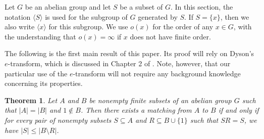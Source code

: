 \documentclass[11pt]{amsart}
\newtheorem{theorem}{Theorem}[section]
\theoremstyle{definition}
\theoremstyle{remark}
\begin{document}
Let \( G \) be an abelian group and let \( S \) be a subset of \( G \).  In this section, the notation \( \langle S \rangle \) is used for the subgroup of \( G \) generated by \( S \). If \( S = \{ x \} \), then we also write \( \langle x \rangle \) for this subgroup. We use \( o(x) \) for the order of any \( x \in G \), with the understanding that \( o(x) = \infty \) if \( x \) does not have finite order.  

The following is the first main result of this paper.  Its proof will rely on Dyson's \( e \)-transform, which is discussed in Chapter 2 of \cite{Nathanson}.
Note, however, that our particular use of the \( e \)-transform will not require any background knowledge concerning its properties.

\begin{theorem}  \label{CharForAbelianGroups}
Let \( A \) and \( B \) be nonempty finite subsets of an abelian group \( G \) such that \( |A| = |B| \) and \( 1 \notin B \).  Then there exists a matching from \( A \) to \( B \) if and only if for every pair of nonempty subsets \( S \subseteq A \) and \( R \subseteq B \cup \{ 1 \} \) such that \( SR = S \), we have \( |S| \leq |B \setminus R| \).
\end{theorem}
\end{document}
